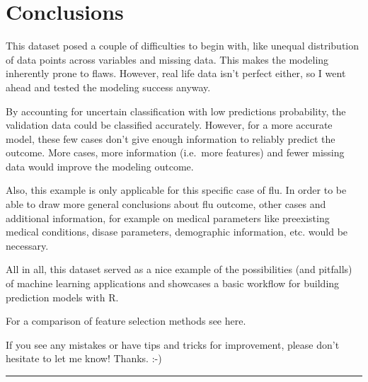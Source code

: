 \documentclass[]{book}
\begin{document}
\hypertarget{conclusions}{%
\section{Conclusions}\label{conclusions}}

This dataset posed a couple of difficulties to begin with, like unequal distribution of data points across variables and missing data. This makes the modeling inherently prone to flaws. However, real life data isn't perfect either, so I went ahead and tested the modeling success anyway.

By accounting for uncertain classification with low predictions probability, the validation data could be classified accurately. However, for a more accurate model, these few cases don't give enough information to reliably predict the outcome. More cases, more information (i.e.~more features) and fewer missing data would improve the modeling outcome.

Also, this example is only applicable for this specific case of flu. In order to be able to draw more general conclusions about flu outcome, other cases and additional information, for example on medical parameters like preexisting medical conditions, disase parameters, demographic information, etc. would be necessary.

All in all, this dataset served as a nice example of the possibilities (and pitfalls) of machine learning applications and showcases a basic workflow for building prediction models with R.

For a comparison of feature selection methods see here.

If you see any mistakes or have tips and tricks for improvement, please don't hesitate to let me know! Thanks. :-)

\begin{center}\rule{0.5\linewidth}{\linethickness}\end{center}
\end{document}
